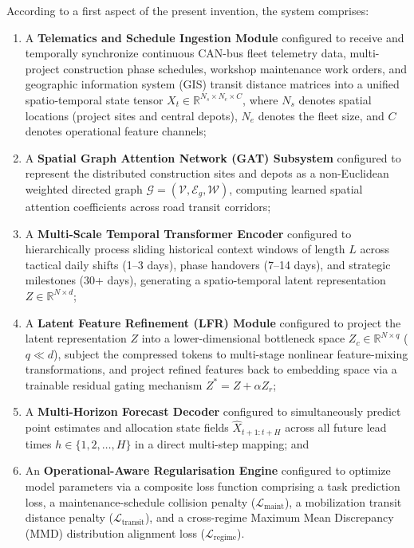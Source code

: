 \documentclass[11pt,a4paper]{article}
\begin{document}
\noindent According to a first aspect of the present invention, the system comprises:
\begin{enumerate}
    \item A \textbf{Telematics and Schedule Ingestion Module} configured to receive and temporally synchronize continuous CAN-bus fleet telemetry data, multi-project construction phase schedules, workshop maintenance work orders, and geographic information system (GIS) transit distance matrices into a unified spatio-temporal state tensor $X_t \in \mathbb{R}^{N_s \times N_e \times C}$, where $N_s$ denotes spatial locations (project sites and central depots), $N_e$ denotes the fleet size, and $C$ denotes operational feature channels;
    \item A \textbf{Spatial Graph Attention Network (GAT) Subsystem} configured to represent the distributed construction sites and depots as a non-Euclidean weighted directed graph $\mathcal{G} = (\mathcal{V}, \mathcal{E}_g, \mathcal{W})$, computing learned spatial attention coefficients across road transit corridors;
    \item A \textbf{Multi-Scale Temporal Transformer Encoder} configured to hierarchically process sliding historical context windows of length $L$ across tactical daily shifts (1--3 days), phase handovers (7--14 days), and strategic milestones (30+ days), generating a spatio-temporal latent representation $Z \in \mathbb{R}^{N \times d}$;
    \item A \textbf{Latent Feature Refinement (LFR) Module} configured to project the latent representation $Z$ into a lower-dimensional bottleneck space $Z_c \in \mathbb{R}^{N \times q}$ ($q \ll d$), subject the compressed tokens to multi-stage nonlinear feature-mixing transformations, and project refined features back to embedding space via a trainable residual gating mechanism $Z^* = Z + \alpha Z_r$;
    \item A \textbf{Multi-Horizon Forecast Decoder} configured to simultaneously predict point estimates and allocation state fields $\widehat{X}_{t+1:t+H}$ across all future lead times $h \in \{1, 2, \dots, H\}$ in a direct multi-step mapping; and
    \item An \textbf{Operational-Aware Regularisation Engine} configured to optimize model parameters via a composite loss function comprising a task prediction loss, a maintenance-schedule collision penalty ($\mathcal{L}_{\text{maint}}$), a mobilization transit distance penalty ($\mathcal{L}_{\text{transit}}$), and a cross-regime Maximum Mean Discrepancy (MMD) distribution alignment loss ($\mathcal{L}_{\text{regime}}$).
\end{enumerate}
\end{document}
